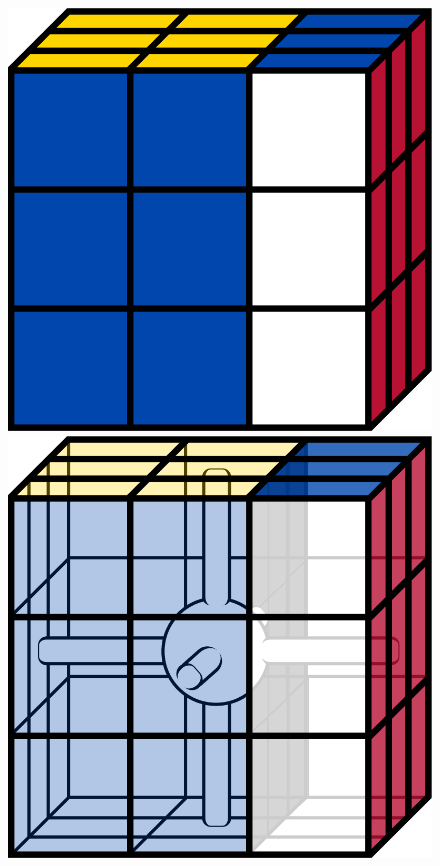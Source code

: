 \documentclass[12pt]{article}
\begin{document}
\begin{figure}[h]
\begin{minipage}[c]{0.2\textwidth}
    \end{minipage}
    \begin{minipage}[c]{0.05\textwidth}
        \centering
    \end{minipage}
    \hspace{0.5cm}
    \begin{minipage}[c]{0.2\textwidth}
        \includegraphics[scale=0.1]{cube_r.png}
    \end{minipage}
    \begin{minipage}[c]{0.2\textwidth}
        \includegraphics[scale=0.1]{core_r_transform.png}

\end{minipage}
\end{figure}
\end{document}
